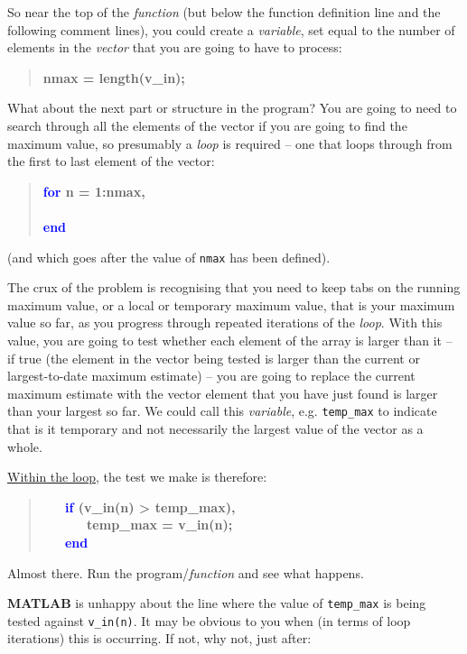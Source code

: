 \documentclass{tufte-book} %
\newenvironment{docspecbold}{\begin{quotation}\ttfamily\bfseries\parskip0pt\parindent0pt\ignorespaces}{\end{quotation}}
\begin{document}
So near the top of the \textit{function} (but below the function definition line and the following comment lines), you could create a \textit{variable}, set equal to the number of elements in the \textit{vector} that you are going to have to process:
\begin{docspecbold}
nmax = length(v\_in);
\end{docspecbold}

What about the next part or structure in the program? You are going to need to search through all the elements of the vector if you are going to find the maximum value, so presumably a \textit{loop} is required -- one that loops through from the first to last element of the vector:
\begin{docspecbold}
\textcolor{blue}{for} n = 1:nmax,\\
\ \\
\textcolor{blue}{end}
\end{docspecbold}
(and which goes after the value of \texttt{nmax} has been defined).

The crux of the problem is recognising that you need to keep tabs on the running maximum value, or a local or temporary maximum value, that is your maximum value so far, as you progress through repeated iterations of the \textit{loop}. With this value, you are going to test whether each element of the array is larger than it -- if true (the element in the vector being tested is larger than the current or largest-to-date maximum estimate) -- you are going to replace the current maximum estimate with the vector element that you have just found is larger than your largest so far. We could call this \textit{variable}, e.g. \texttt{temp\_max} to indicate that is it temporary and not necessarily the largest value of the vector as a whole.

\uline{Within the loop}, the test we make is therefore:
\begin{docspecbold}
\ \ \ \textcolor{blue}{if} (v\_in(n) > temp\_max),\\
\ \ \ \ \ \ temp\_max = v\_in(n);\\
\ \ \ \textcolor{blue}{end}
\end{docspecbold}

Almost there. Run the program/\textit{function} and see what happens.

\textbf{MATLAB} is unhappy about the line where the value of \texttt{temp\_max} is being tested against \texttt{v\_in(n)}. It may be obvious to you when (in terms of loop iterations) this is occurring. If not, why not, just after:
\end{document}
